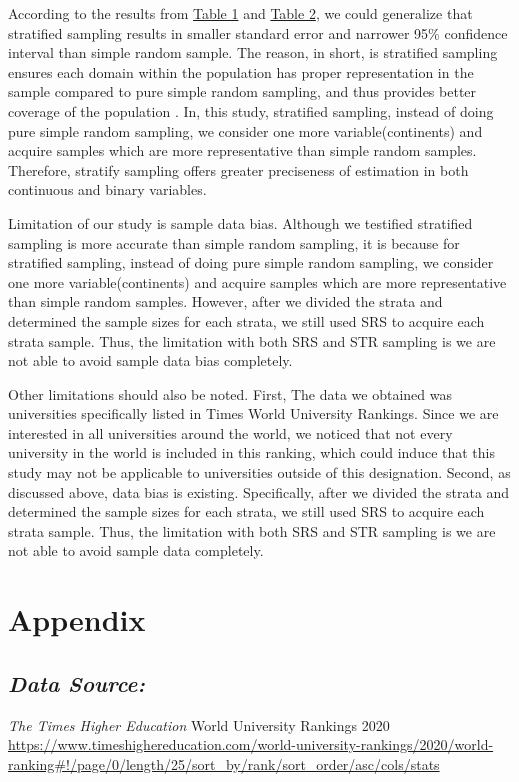 \documentclass{article}
\begin{document}
According to the results from {\hyperref[tab:(a)]{Table 1}} and {\hyperref[tab:(b)]{Table 2}}, we could generalize that stratified sampling results in smaller standard error and narrower 95\% confidence interval than simple random sample. The reason, in short, is stratified sampling ensures each domain within the population has proper representation in the sample compared to pure simple random sampling, and thus provides better coverage of the population . In, this study, stratified sampling, instead of doing pure simple random sampling, we consider one more variable(continents) and acquire samples which are more representative than simple random samples. Therefore, stratify sampling offers greater preciseness of estimation in both continuous and binary variables.

Limitation of our study is sample data bias. Although we testified stratified sampling is more accurate than simple random sampling, it is because for stratified sampling, instead of doing pure simple random sampling, we consider one more variable(continents) and acquire samples which are more representative than simple random samples. However, after we divided the strata and determined the sample sizes for each strata, we still used SRS to acquire each strata sample. Thus, the limitation with both SRS and STR sampling is we are not able to avoid sample data bias completely.

Other limitations should also be noted. First, The data we obtained was universities specifically listed in Times World University Rankings. Since we are interested in all universities around the world, we noticed that not every university in the world is included in this ranking, which could induce that this study may not be applicable to universities outside of this designation. Second, as discussed above, data bias is existing. Specifically, after we divided the strata and determined the sample sizes for each strata, we still used SRS to acquire each strata sample. Thus, the limitation with both SRS and STR sampling is we are not able to avoid sample data completely.


\section{Appendix}
\subsection{\textbf{\textit{Data Source:}}}
\textit{The Times Higher Education} World University Rankings 2020\\
\url{https://www.timeshighereducation.com/world-university-rankings/2020/world-ranking#!/page/0/length/25/sort_by/rank/sort_order/asc/cols/stats}
\end{document}
